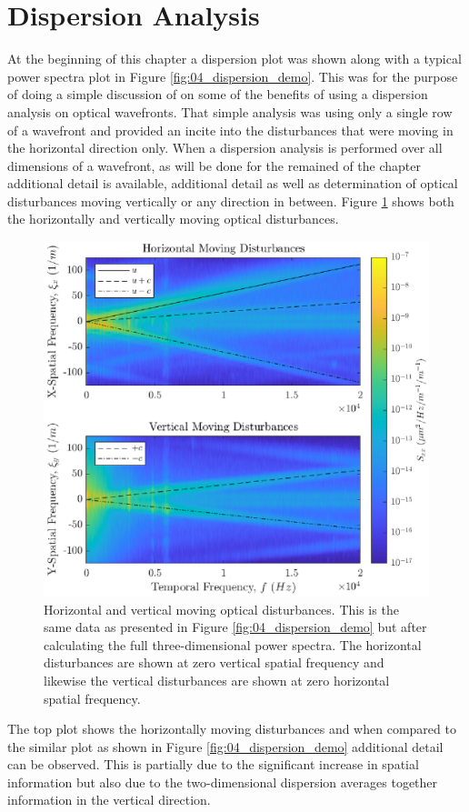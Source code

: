 \section{Dispersion Analysis}
At the beginning of this chapter a dispersion plot was shown along with a typical power spectra plot in Figure \ref{fig:04_dispersion_demo}.
This was for the purpose of doing a simple discussion of on some of the benefits of using a dispersion analysis on optical wavefronts.
That simple analysis was using only a single row of a wavefront and provided an incite into the disturbances that were moving in the horizontal direction only.
When a dispersion analysis is performed over all dimensions of a wavefront, as will be done for the remained of the chapter additional detail is available, additional detail as well as determination of optical disturbances moving vertically or any direction in between.
Figure \ref{fig:04_dispersion_xy} shows both the horizontally and vertically moving optical disturbances.
\begin{figure}
  \centering
  \includegraphics{../matlab/04_dispersion_analysis/dispersion_xy.eps}
  \caption{Horizontal and vertical moving optical disturbances. This is the same data as presented in Figure \ref{fig:04_dispersion_demo} but after calculating the full three-dimensional power spectra. The horizontal disturbances are shown at zero vertical spatial frequency and likewise the vertical disturbances are shown at zero horizontal spatial frequency.}
  \label{fig:04_dispersion_xy}
\end{figure}
The top plot shows the horizontally moving disturbances and when compared to the similar plot as shown in Figure \ref{fig:04_dispersion_demo} additional detail can be observed.
This is partially due to the significant increase in spatial information but also due to the two-dimensional dispersion averages together information in the vertical direction.


